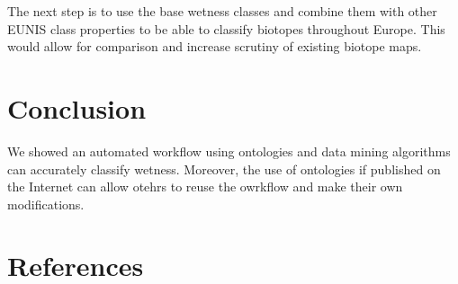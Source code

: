\documentclass[authoryear, review,12pt,number]{elsarticle}
\begin{document}
The next step is to use the base wetness classes and combine them with other
EUNIS class properties to be able to classify biotopes throughout Europe. This
would allow for comparison and increase scrutiny of existing biotope maps.

\section{Conclusion}
We showed an automated workflow using ontologies and data mining algorithms can
accurately classify wetness. Moreover, the use of ontologies if published on the
Internet can allow otehrs to reuse the owrkflow and make their own
modifications.

\section{References}

\end{document}
